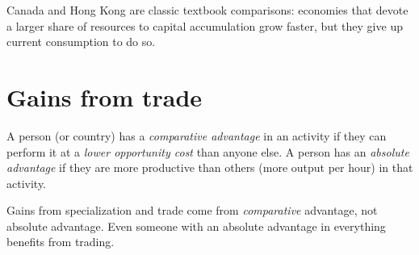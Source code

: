 \begin{center}
\end{center}

\begin{remark}
Canada and Hong Kong are classic textbook comparisons: economies that devote a larger
share of resources to capital accumulation grow faster, but they give up current
consumption to do so.
\end{remark}

\section{Gains from trade}

\begin{definition}
A person (or country) has a \emph{comparative advantage} in an activity if they can
perform it at a \emph{lower opportunity cost} than anyone else. A person has an
\emph{absolute advantage} if they are more productive than others (more output per hour)
in that activity.
\end{definition}

Gains from specialization and trade come from \emph{comparative} advantage, not absolute
advantage. Even someone with an absolute advantage in everything benefits from trading.

